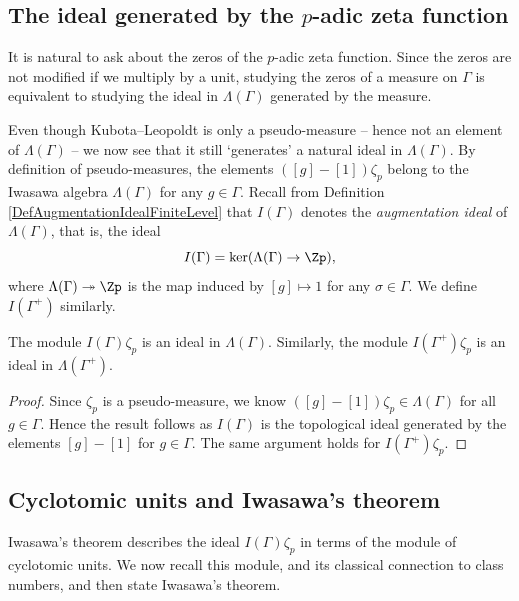 \documentclass[a4paper,10pt, english, reqno]{smfart}
\newcommand{\GG}{\Gamma}
\numberwithin{equation}{section}
\begin{document}
\subsection{The ideal generated by the $p$-adic zeta function}

It is natural to ask about the zeros of the $p$-adic zeta function. Since the zeros are not modified if we multiply by a unit, studying the zeros of a measure on $\GG$ is equivalent to studying the ideal in $\Lambda(\GG)$ generated by the measure. 

Even though Kubota--Leopoldt is only a pseudo-measure -- hence not an element of $\Lambda(\GG)$ -- we now see that it still `generates' a natural ideal in $\Lambda(\GG)$. By definition of pseudo-measures, the elements $([g] - [1]) \zeta_p$ belong to the Iwasawa algebra $\Lambda(\GG)$ for any  $g\in \GG$. Recall from Definition \ref{DefAugmentationIdealFiniteLevel} that $I(\GG)$ denotes the \emph{augmentation ideal} of $\Lambda(\GG)$, that is, the ideal
\[ I(\GG) = \ker(\Lambda(\GG) \to \Zp), \]
where $\Lambda(\GG) \twoheadrightarrow \Zp$ is the map induced by $[g] \mapsto 1$ for any $\sigma \in \GG$. We define $I(\GG^+)$ similarly.


\begin{proposition}
	The module $I(\GG)\zeta_p$ is an ideal in $\Lambda(\GG)$. Similarly, the module $ I(\GG^+)\zeta_p$ is an ideal in $\Lambda(\GG^+)$.
\end{proposition}
\begin{proof}
	Since $\zeta_p$ is a pseudo-measure, we know $([g]-[1])\zeta_p \in \Lambda(\GG)$ for all $g \in \GG$. Hence the result follows as $I(\GG)$ is the topological ideal generated by the elements $[g] - [1]$ for $g \in \GG$. The same argument holds for $I(\GG^+)\zeta_p$.
\end{proof}


\subsection{Cyclotomic units and Iwasawa's theorem}

Iwasawa's theorem describes the ideal $I(\GG)\zeta_p$ in terms of the module of cyclotomic units. We now recall this module, and its classical connection to class numbers, and then state Iwasawa's theorem.  %
\end{document}
